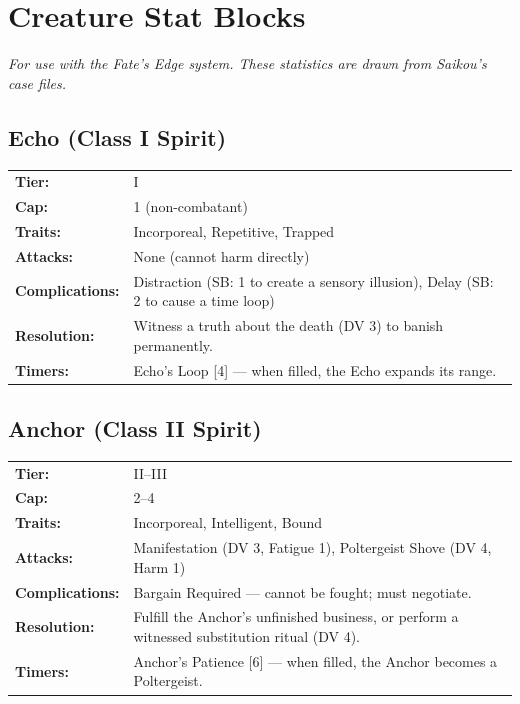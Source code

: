 \section{Creature Stat Blocks}

\emph{For use with the Fate's Edge system. These statistics are drawn from Saikou's case files.}

\subsection{Echo (Class I Spirit)}
\begin{tabular}{@{}ll}
\textbf{Tier:} & I \\
\textbf{Cap:} & 1 (non-combatant) \\
\textbf{Traits:} & Incorporeal, Repetitive, Trapped \\
\textbf{Attacks:} & None (cannot harm directly) \\
\textbf{Complications:} & Distraction (SB: 1 to create a sensory illusion), Delay (SB: 2 to cause a time loop) \\
\textbf{Resolution:} & Witness a truth about the death (DV 3) to banish permanently. \\
\textbf{Timers:} & Echo's Loop [4] --- when filled, the Echo expands its range. \\
\end{tabular}

\subsection{Anchor (Class II Spirit)}
\begin{tabular}{@{}ll}
\textbf{Tier:} & II--III \\
\textbf{Cap:} & 2--4 \\
\textbf{Traits:} & Incorporeal, Intelligent, Bound \\
\textbf{Attacks:} & Manifestation (DV 3, Fatigue 1), Poltergeist Shove (DV 4, Harm 1) \\
\textbf{Complications:} & Bargain Required --- cannot be fought; must negotiate. \\
\textbf{Resolution:} & Fulfill the Anchor's unfinished business, or perform a witnessed substitution ritual (DV 4). \\
\textbf{Timers:} & Anchor's Patience [6] --- when filled, the Anchor becomes a Poltergeist. \\
\end{tabular}

